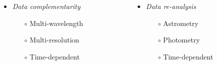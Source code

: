 \begin{frame}
\begin{overlayarea}{\textwidth}{.3\textheight}
\begin{columns}[T]
      \begin{column}{.35\textwidth}
        \begin{itemize}[<+->]
          \item \emph{Data complementarity}
            \begin{itemize}[<.->]
              \item[$\circ$] Multi-wavelength
              \item[$\circ$] Multi-resolution
              \item[$\circ$] Time-dependent
            \end{itemize}
          \end{itemize}
      \end{column}

      \begin{column}{.35\textwidth}
        \begin{itemize}[<+->]
          \item \emph{Data re-analysis}
            \begin{itemize}[<.->]
              \item[$\circ$] Astrometry
              \item[$\circ$] Photometry
              \item[$\circ$] Time-dependent
            \end{itemize}
          \end{itemize}
      \end{column}
  
    \end{columns}
  \end{overlayarea}

\end{frame}





